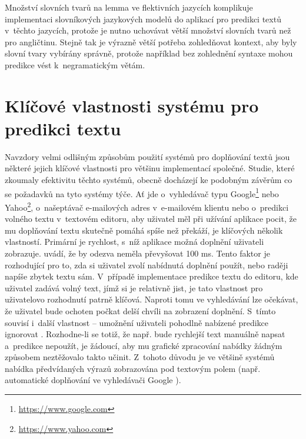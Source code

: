 \documentclass[a4paper,11pt,openany]{book} %
\begin{document}

Množství slovních tvarů na lemma ve flektivních jazycích komplikuje implementaci slovníkových jazykových modelů do aplikací pro predikci textů v~těchto jazycích, protože je nutno uchovávat větší množství slovních tvarů než pro angličtinu. Stejně tak je výrazně větší potřeba zohledňovat kontext, aby byly slovní tvary vybírány správně, protože například bez zohlednění syntaxe mohou predikce vést k~negramatickým větám. \parencite[5234--5235]{ghayoomi2009overview}

\chapter{Klíčové vlastnosti systému pro predikci textu}

Navzdory velmi odlišným způsobům použití systémů pro doplňování textů jsou některé jejich klíčové vlastnosti pro většinu implementací společné. Studie, které zkoumaly efektivitu těchto systémů, obecně docházejí ke podobným závěrům co se požadavků na tyto systémy týče. Ať jde o~vyhledávač typu Google\footnote{\url{https://www.google.com}} nebo Yahoo\footnote{\url{https://www.yahoo.com}}, o~našeptávač e-mailových adres v~e-mailovém klientu nebo o~predikci volného textu v~textovém editoru, aby uživatel měl při užívání aplikace pocit, že mu doplňování textu skutečně pomáhá spíše než překáží, je klíčových několik vlastností.  Primární je rychlost, s~níž aplikace možná doplnění uživateli zobrazuje. \parencite{nandi2007assisted} uvádí, že by odezva neměla převyšovat 100 ms. Tento faktor je rozhodující pro to, zda si uživatel zvolí nabídnutá doplnění použít, nebo raději napíše zbytek textu sám. V~případě implementace predikce textu do editoru, kde uživatel zadává volný text, jímž si je relativně jist, je tato vlastnost pro uživatelovo rozhodnutí patrně klíčová. Naproti tomu ve vyhledávání lze očekávat, že uživatel bude ochoten počkat delší chvíli na zobrazení doplnění. S~tímto souvisí i~další vlastnost -- umožnění uživateli pohodlně nabízené predikce ignorovat \parencite{ward2012autocomplete}. Rozhodne-li se totiž, že např. bude rychlejší text manuálně napsat a~predikce nepoužít, je žádoucí, aby mu grafické zpracování nabídky žádným způsobem neztěžovalo takto učinit. Z~tohoto důvodu je ve většině systémů nabídka předvídaných výrazů zobrazována pod textovým polem (např. automatické doplňování ve vyhledávači Google \parencite{google2015}). 
\end{document}
